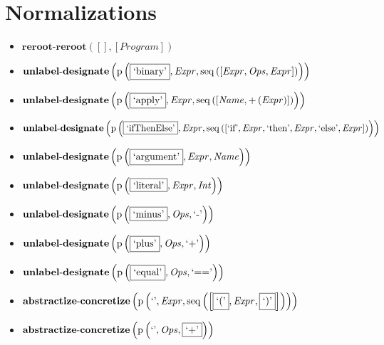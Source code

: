 \section{Normalizations}
{\footnotesize\begin{itemize}
\item $\mathbf{reroot\text{-}reroot}\left([],[\mathit{Program}]\right)$
\item $\mathbf{unlabel\text{-}designate}\\\left(\mathrm{p}\left(\fbox{\text{`binary'}},\mathit{Expr},\mathrm{seq}\left(\left[\mathit{Expr}, \mathit{Ops}, \mathit{Expr}\right]\right)\right)\right)$
\item $\mathbf{unlabel\text{-}designate}\\\left(\mathrm{p}\left(\fbox{\text{`apply'}},\mathit{Expr},\mathrm{seq}\left(\left[\mathit{Name}, {+}\left(\mathit{Expr}\right)\right]\right)\right)\right)$
\item $\mathbf{unlabel\text{-}designate}\\\left(\mathrm{p}\left(\fbox{\text{`ifThenElse'}},\mathit{Expr},\mathrm{seq}\left(\left[\text{`if'}, \mathit{Expr}, \text{`then'}, \mathit{Expr}, \text{`else'}, \mathit{Expr}\right]\right)\right)\right)$
\item $\mathbf{unlabel\text{-}designate}\\\left(\mathrm{p}\left(\fbox{\text{`argument'}},\mathit{Expr},\mathit{Name}\right)\right)$
\item $\mathbf{unlabel\text{-}designate}\\\left(\mathrm{p}\left(\fbox{\text{`literal'}},\mathit{Expr},\mathit{Int}\right)\right)$
\item $\mathbf{unlabel\text{-}designate}\\\left(\mathrm{p}\left(\fbox{\text{`minus'}},\mathit{Ops},\text{`-'}\right)\right)$
\item $\mathbf{unlabel\text{-}designate}\\\left(\mathrm{p}\left(\fbox{\text{`plus'}},\mathit{Ops},\text{`+'}\right)\right)$
\item $\mathbf{unlabel\text{-}designate}\\\left(\mathrm{p}\left(\fbox{\text{`equal'}},\mathit{Ops},\text{`=='}\right)\right)$
\item $\mathbf{abstractize\text{-}concretize}\\\left(\mathrm{p}\left(\text{`'},\mathit{Expr},\mathrm{seq}\left(\left[\fbox{$\text{`('}$}, \mathit{Expr}, \fbox{$\text{`)'}$}\right]\right)\right)\right)$
\item $\mathbf{abstractize\text{-}concretize}\\\left(\mathrm{p}\left(\text{`'},\mathit{Ops},\fbox{$\text{`+'}$}\right)\right)$

\end{itemize}}
